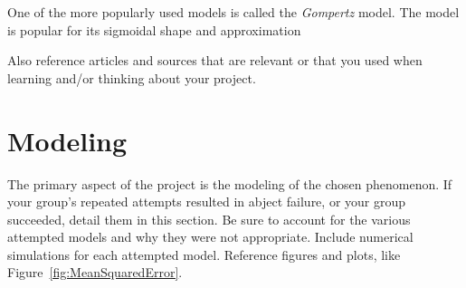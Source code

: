 \documentclass[11pt]{amsart}
\begin{document}
One of the more popularly used models is called the \textit{Gompertz} model.
The model is popular for its sigmoidal shape and approximation






Also reference articles and sources \cite{Vandermeersch} that are relevant or that you used when learning and/or thinking about your project.




\section{Modeling}

 The primary aspect of the project is the modeling of the chosen phenomenon. If your group's repeated attempts resulted in abject failure, or your group succeeded, detail them in this section. Be sure to account for the various attempted models and why they were not appropriate. Include numerical simulations for each attempted model.  Reference figures and plots, like Figure~\ref{fig:MeanSquaredError}.
\end{document}

